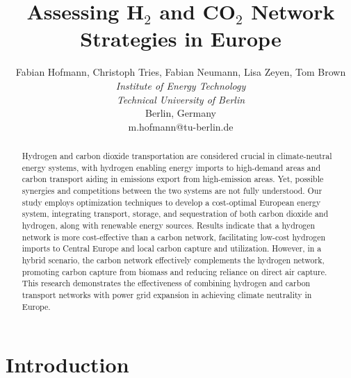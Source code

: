 \documentclass[twocolumn]{article}
\newcommand{\carbon}{CO$_2$}
\newcommand{\hydrogen}{H$_2$}
\begin{document}

\title{Assessing \hydrogen{} and \carbon{} Network Strategies in Europe}

\author{
    Fabian Hofmann, Christoph Tries, Fabian Neumann, Lisa Zeyen, Tom Brown \\
    \textit{Institute of Energy Technology} \\
    \textit{Technical University of Berlin}\\
    Berlin, Germany \\
    m.hofmann@tu-berlin.de
}


\maketitle

\begin{abstract}
    Hydrogen and carbon dioxide transportation are considered crucial in climate-neutral energy systems, with hydrogen enabling energy imports to high-demand areas and carbon transport aiding in emissions export from high-emission areas. Yet, possible synergies and competitions between the two systems are not fully understood. Our study employs optimization techniques to develop a cost-optimal European energy system, integrating transport, storage, and sequestration of both carbon dioxide and hydrogen, along with renewable energy sources. Results indicate that a hydrogen network is more cost-effective than a carbon network, facilitating low-cost hydrogen imports to Central Europe and local carbon capture and utilization. However, in a hybrid scenario, the carbon network effectively complements the hydrogen network, promoting carbon capture from biomass and reducing reliance on direct air capture. This research demonstrates the effectiveness of combining hydrogen and carbon transport networks with power grid expansion in achieving climate neutrality in Europe.
\end{abstract}


\section{Introduction}
\end{document}
